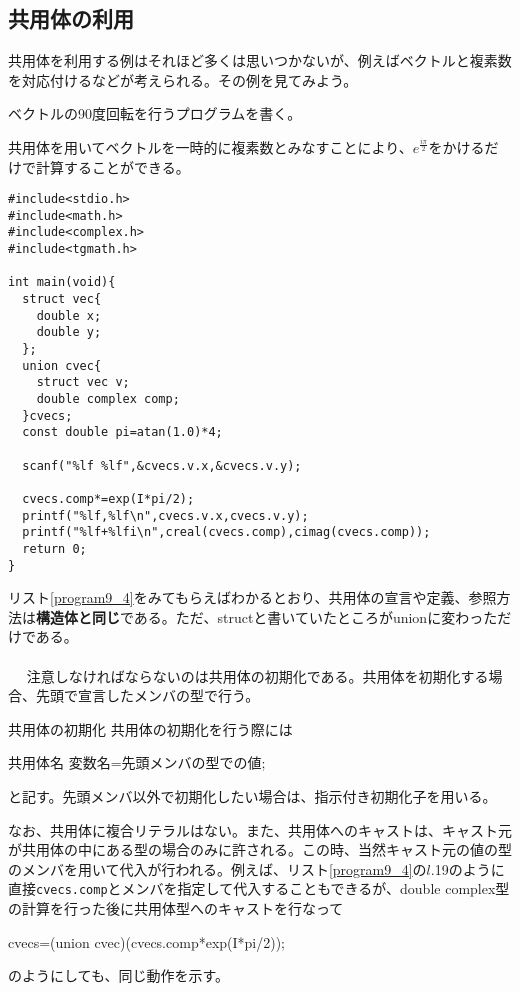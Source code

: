 \subsection{共用体の利用}
共用体を利用する例はそれほど多くは思いつかないが、例えばベクトルと複素数を対応付けるなどが考えられる。その例を見てみよう。
\begin{boxnote}
ベクトルの90度回転を行うプログラムを書く。
\end{boxnote}

\begin{boxnote}
共用体を用いてベクトルを一時的に複素数とみなすことにより、$e^{\frac{i\pi}{2}}$をかけるだけで計算することができる。
\begin{lstlisting}[caption=ベクトルの回転,label=program9_4]
#include<stdio.h>
#include<math.h>
#include<complex.h>
#include<tgmath.h>

int main(void){
  struct vec{
    double x;
    double y;
  };
  union cvec{
    struct vec v;
    double complex comp;
  }cvecs;
  const double pi=atan(1.0)*4;

  scanf("%lf %lf",&cvecs.v.x,&cvecs.v.y);

  cvecs.comp*=exp(I*pi/2);
  printf("%lf,%lf\n",cvecs.v.x,cvecs.v.y);
  printf("%lf+%lfi\n",creal(cvecs.comp),cimag(cvecs.comp));
  return 0;
}

\end{lstlisting}
\end{boxnote}

リスト\ref{program9_4}をみてもらえばわかるとおり、共用体の宣言や定義、参照方法は\textbf{構造体と同じ}である。ただ、structと書いていたところがunionに変わっただけである。
\\ \\　
注意しなければならないのは共用体の初期化である。共用体を初期化する場合、先頭で宣言したメンバの型で行う。
\begin{itembox}[l]{共用体の初期化}
共用体の初期化を行う際には
\begin{code}
共用体名 変数名={先頭メンバの型での値};
\end{code}
と記す。先頭メンバ以外で初期化したい場合は、指示付き初期化子を用いる。
\end{itembox}

なお、共用体に複合リテラルはない。また、共用体へのキャストは、キャスト元が共用体の中にある型の場合のみに許される。この時、当然キャスト元の値の型のメンバを用いて代入が行われる。例えば、リスト\ref{program9_4}の$l$.19のように直接\verb|cvecs.comp|とメンバを指定して代入することもできるが、double complex型の計算を行った後に共用体型へのキャストを行なって
\begin{code}
cvecs=(union cvec)(cvecs.comp*exp(I*pi/2));
\end{code}
のようにしても、同じ動作を示す。

